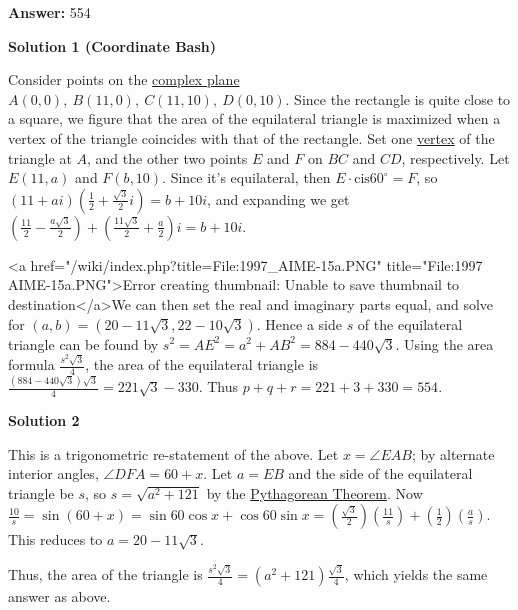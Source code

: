 \begin{enumerate}
 
 \textbf{Answer: }554



\textbf{Solution 1 (Coordinate Bash)}

Consider points on the \href{https://artofproblemsolving.com/wiki/index.php?title=Complex\_plane}{complex plane} $A (0,0),\ B (11,0),\ C (11,10),\ D (0,10)$. Since the rectangle is quite close to a square, we figure that the area of the equilateral triangle is maximized when a vertex of the triangle coincides with that of the rectangle. Set one \href{https://artofproblemsolving.com/wiki/index.php?title=Vertex}{vertex} of the triangle at $A$, and the other two points $E$ and $F$ on $BC$ and $CD$, respectively. Let $E (11,a)$ and $F (b, 10)$. Since it's equilateral, then $E\cdot\text{cis}60^{\circ} = F$, so $(11 + ai)\left(\frac {1}{2} + \frac {\sqrt {3}}{2}i\right) = b + 10i$, and expanding we get $\left(\frac {11}{2} - \frac {a\sqrt {3}}{2}\right) + \left(\frac {11\sqrt {3}}{2} + \frac {a}{2}\right)i = b + 10i$.

 <a href="/wiki/index.php?title=File:1997\_AIME-15a.PNG" title="File:1997 AIME-15a.PNG">Error creating thumbnail: Unable to save thumbnail to destination</a>We can then set the real and imaginary parts equal, and solve for $(a,b) = (20 - 11\sqrt {3},22 - 10\sqrt {3})$. Hence a side $s$ of the equilateral triangle can be found by $s^2 = AE^2 = a^2 + AB^2 = 884 - 440\sqrt{3}$. Using the area formula $\frac{s^2\sqrt{3}}{4}$, the area of the equilateral triangle is $\frac{(884-440\sqrt{3})\sqrt{3}}{4} = 221\sqrt{3} - 330$. Thus $p + q + r = 221 + 3 + 330 = \boxed{554}$.

 



\textbf{Solution 2}

This is a trigonometric re-statement of the above. Let $x = \angle EAB$; by alternate interior angles, $\angle DFA=60+x$. Let $a = EB$ and the side of the equilateral triangle be $s$, so $s= \sqrt{a^2+121}$ by the \href{https://artofproblemsolving.com/wiki/index.php?title=Pythagorean\_Theorem}{Pythagorean Theorem}. Now $\frac{10}{s} = \sin(60+x)=  \sin {60} \cos x+ \cos {60} \sin x = \left(\frac{\sqrt{3}}2\right)\left(\frac{11}s\right)+\left(\frac 12\right)\left( \frac as \right)$. This reduces to $a=20-11\sqrt{3}$. 

 Thus, the area of the triangle is $\frac{s^2\sqrt{3}}{4} =(a^2+121)\frac{\sqrt{3}}{4}$, which yields the same answer as above.

 




\end{enumerate}
